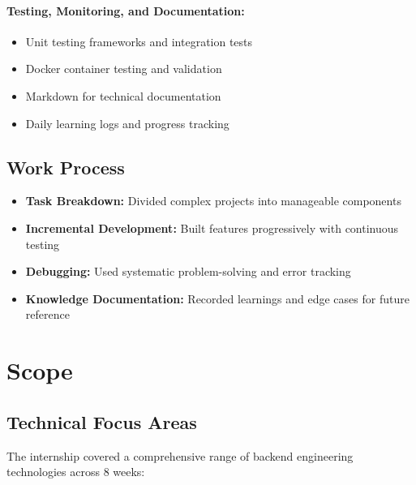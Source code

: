 \paragraph{Testing, Monitoring, and Documentation:}
\begin{itemize}
    \item Unit testing frameworks and integration tests
    \item Docker container testing and validation
    \item Markdown for technical documentation
    \item Daily learning logs and progress tracking
\end{itemize}

\subsection{Work Process}

\begin{itemize}
    \item \textbf{Task Breakdown:} Divided complex projects into manageable components
    \item \textbf{Incremental Development:} Built features progressively with continuous testing
    \item \textbf{Debugging:} Used systematic problem-solving and error tracking
    \item \textbf{Knowledge Documentation:} Recorded learnings and edge cases for future reference
\end{itemize}

\section{Scope}

\subsection{Technical Focus Areas}

The internship covered a comprehensive range of backend engineering technologies across 8 weeks:

